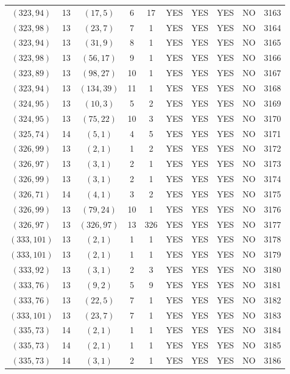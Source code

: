 \begin{longtable}{|c|c|c|c|c|c|c|c|c|c|}
$(323, 94)$ & 13 & $(17, 5)$ & 6 & 17 & YES & YES & YES & NO & 3163\\
$(323, 98)$ & 13 & $(23, 7)$ & 7 & 1 & YES & YES & YES & NO & 3164\\
$(323, 94)$ & 13 & $(31, 9)$ & 8 & 1 & YES & YES & YES & NO & 3165\\
$(323, 98)$ & 13 & $(56, 17)$ & 9 & 1 & YES & YES & YES & NO & 3166\\
$(323, 89)$ & 13 & $(98, 27)$ & 10 & 1 & YES & YES & YES & NO & 3167\\
$(323, 94)$ & 13 & $(134, 39)$ & 11 & 1 & YES & YES & YES & NO & 3168\\
$(324, 95)$ & 13 & $(10, 3)$ & 5 & 2 & YES & YES & YES & NO & 3169\\
$(324, 95)$ & 13 & $(75, 22)$ & 10 & 3 & YES & YES & YES & NO & 3170\\
$(325, 74)$ & 14 & $(5, 1)$ & 4 & 5 & YES & YES & YES & NO & 3171\\
$(326, 99)$ & 13 & $(2, 1)$ & 1 & 2 & YES & YES & YES & NO & 3172\\
$(326, 97)$ & 13 & $(3, 1)$ & 2 & 1 & YES & YES & YES & NO & 3173\\
$(326, 99)$ & 13 & $(3, 1)$ & 2 & 1 & YES & YES & YES & NO & 3174\\
$(326, 71)$ & 14 & $(4, 1)$ & 3 & 2 & YES & YES & YES & NO & 3175\\
$(326, 99)$ & 13 & $(79, 24)$ & 10 & 1 & YES & YES & YES & NO & 3176\\
$(326, 97)$ & 13 & $(326, 97)$ & 13 & 326 & YES & YES & YES & NO & 3177\\
$(333, 101)$ & 13 & $(2, 1)$ & 1 & 1 & YES & YES & YES & NO & 3178\\
$(333, 101)$ & 13 & $(2, 1)$ & 1 & 1 & YES & YES & YES & NO & 3179\\
$(333, 92)$ & 13 & $(3, 1)$ & 2 & 3 & YES & YES & YES & NO & 3180\\
$(333, 76)$ & 13 & $(9, 2)$ & 5 & 9 & YES & YES & YES & NO & 3181\\
$(333, 76)$ & 13 & $(22, 5)$ & 7 & 1 & YES & YES & YES & NO & 3182\\
$(333, 101)$ & 13 & $(23, 7)$ & 7 & 1 & YES & YES & YES & NO & 3183\\
$(335, 73)$ & 14 & $(2, 1)$ & 1 & 1 & YES & YES & YES & NO & 3184\\
$(335, 73)$ & 14 & $(2, 1)$ & 1 & 1 & YES & YES & YES & NO & 3185\\
$(335, 73)$ & 14 & $(3, 1)$ & 2 & 1 & YES & YES & YES & NO & 3186\\

\end{longtable}
